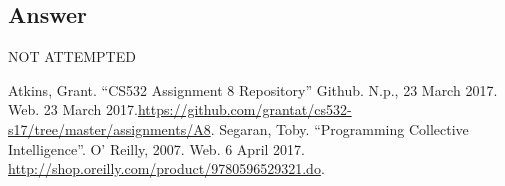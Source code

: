 \documentclass[letterpaper,11pt]{article}
\begin{document}
\subsection*{Answer}

\begin{center}
\Huge{NOT ATTEMPTED}
\end{center}


\clearpage


\clearpage



\begin{thebibliography}{9}
Atkins, Grant. ``CS532 Assignment 8 Repository'' Github. N.p., 23 March 2017. Web. 23 March 2017.\url{https://github.com/grantat/cs532-s17/tree/master/assignments/A8}.
Segaran, Toby. ``Programming Collective Intelligence''. O' Reilly, 2007. Web. 6 April 2017. \url{http://shop.oreilly.com/product/9780596529321.do}.
\end{thebibliography}
\end{document}
